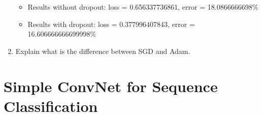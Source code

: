 \documentclass{article} %
\begin{document}
\begin{enumerate}
    \begin{itemize}
        \item
        Results without dropout: loss = 0.656337736861, error = 18.0866666698\%

        \item
        Results with dropout: loss = 0.377996407843, error = 16.606666666699998\%
    \end{itemize}

    \item
    Explain what is the difference between SGD and Adam.

\end{enumerate}

\section{Simple ConvNet for Sequence Classification}
\end{document}
